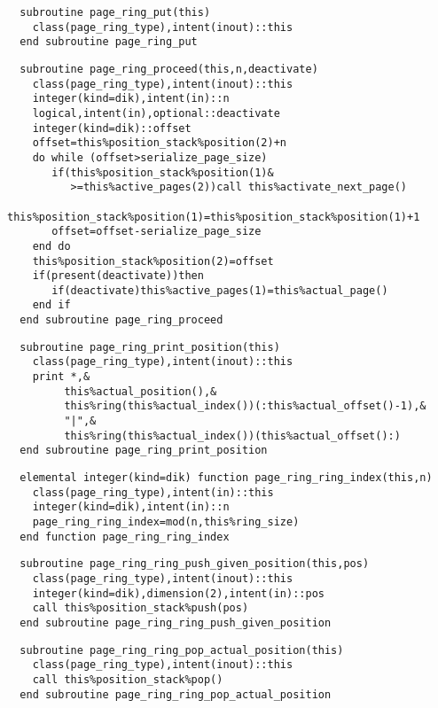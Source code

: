 \begin{Verbatim}
  subroutine page_ring_put(this)
    class(page_ring_type),intent(inout)::this
  end subroutine page_ring_put
\end{Verbatim}

\begin{Verbatim}
  subroutine page_ring_proceed(this,n,deactivate)
    class(page_ring_type),intent(inout)::this
    integer(kind=dik),intent(in)::n
    logical,intent(in),optional::deactivate
    integer(kind=dik)::offset
    offset=this%position_stack%position(2)+n
    do while (offset>serialize_page_size)
       if(this%position_stack%position(1)&
          >=this%active_pages(2))call this%activate_next_page()
       this%position_stack%position(1)=this%position_stack%position(1)+1
       offset=offset-serialize_page_size
    end do
    this%position_stack%position(2)=offset
    if(present(deactivate))then
       if(deactivate)this%active_pages(1)=this%actual_page()
    end if
  end subroutine page_ring_proceed
\end{Verbatim}

\begin{Verbatim}
  subroutine page_ring_print_position(this)
    class(page_ring_type),intent(inout)::this
    print *,&
         this%actual_position(),&
         this%ring(this%actual_index())(:this%actual_offset()-1),&
         "|",&
         this%ring(this%actual_index())(this%actual_offset():)
  end subroutine page_ring_print_position
\end{Verbatim}
  
\begin{Verbatim}
  elemental integer(kind=dik) function page_ring_ring_index(this,n)
    class(page_ring_type),intent(in)::this
    integer(kind=dik),intent(in)::n
    page_ring_ring_index=mod(n,this%ring_size)
  end function page_ring_ring_index
\end{Verbatim}

\begin{Verbatim}
  subroutine page_ring_ring_push_given_position(this,pos)
    class(page_ring_type),intent(inout)::this
    integer(kind=dik),dimension(2),intent(in)::pos
    call this%position_stack%push(pos)
  end subroutine page_ring_ring_push_given_position
\end{Verbatim}

\begin{Verbatim}
  subroutine page_ring_ring_pop_actual_position(this)
    class(page_ring_type),intent(inout)::this
    call this%position_stack%pop()
  end subroutine page_ring_ring_pop_actual_position
\end{Verbatim}

